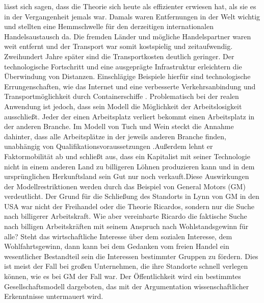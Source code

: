 l{\"a}sst sich sagen, dass die Theorie sich heute als effizienter erwiesen hat, als sie es in der Vergangenheit jemals war. Damals waren Entfernungen in der Welt wichtig und stellten eine Hemmschwelle f{\"u}r den derzeitigen internationalen Handelsaustausch da. Die fremden L{\"a}nder und m{\"o}gliche Handelspartner waren weit entfernt und der Transport war somit kostspielig und zeitaufwendig. Zweihundert Jahre sp{\"a}ter sind die Transport\-kosten deutlich geringer. Der technologische Fortschritt und eine ausgepr{\"a}gte Infrastruktur erleichtern die {\"U}berwindung von Distanzen. Einschl{\"a}gige Beispiele hierf{\"u}r sind technologische Errungenschaften, wie das Internet und eine verbesserte Verkehrsanbindung und Transportm{\"o}glichkeit durch Containerschiffe \citep{Flassbeck.2010,Rosner.2012}. \newline Problematisch bei der realen Anwendung ist jedoch, dass sein Modell die M{\"o}glichkeit der Arbeitslosigkeit ausschlie{\ss}t. Jeder der einen Arbeitsplatz verliert bekommt einen Arbeitsplatz in der anderen Branche. Im Modell von Tuch und Wein steckt die Annahme dahinter, dass alle Arbeitspl{\"a}tze in der jeweils anderen Branche finden, unabhängig von Qualifikationsvoraussetzungen \citep{Ricardo.1817}.\newline Au{\ss}erdem lehnt er Faktormobilit{\"a}t ab und schlie{\ss}t aus, dass ein Kapitalist mit seiner Technologie nicht in einem anderen Land zu billigeren L{\"o}hnen produzieren kann und in dem urspr{\"u}nglichen Herkunftsland sein Gut nur noch verkauft.\newline Diese Auswirkungen der Modellrestriktionen werden durch das Beispiel von General Motors (GM) verdeutlicht. Der Grund f{\"u}r die Schlie{\ss}ung des Standorts in Lynn von GM in den USA war nicht der Freihandel oder die Theorie Ricardos, sondern nur die Suche nach billigerer Arbeitskraft. \newline Wie aber vereinbarte Ricardo die faktische Suche nach billigen Arbeitskr{\"a}ften mit seinem Anspruch nach Wohlstandsgewinn f{\"u}r alle? \newline Steht das wirtschaftliche Interesse {\"u}ber dem sozialen Interesse, dem Wohlfahrtsgewinn, dann kann bei dem Gedanken vom freien Handel ein wesentlicher Bestandteil sein die Interessen bestimmter Gruppen zu f{\"o}rdern. Dies ist meist der Fall bei gro{\ss}en Unternehmen, die ihre Standorte schnell verlegen k{\"o}nnen, wie es bei GM der Fall war. Der {\"O}ffentlichkeit wird ein bestimmtes Gesellschaftsmodell dargeboten, das mit der Argumentation wissenschaftlicher Erkenntnisse untermauert wird.
 
